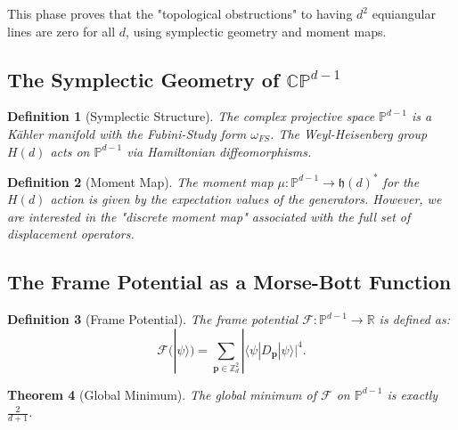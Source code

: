 \documentclass[a4paper,11pt]{article}
\newtheorem{theorem}{Theorem}[section]
\newtheorem{definition}[theorem]{Definition}
\newcommand{\R}{\mathbb{R}}
\newcommand{\Z}{\mathbb{Z}}
\newcommand{\PP}{\mathbb{P}}
\begin{document}
This phase proves that the "topological obstructions" to having $d^2$ equiangular lines are zero for all $d$, using symplectic geometry and moment maps.

\subsection{The Symplectic Geometry of $\mathbb{CP}^{d-1}$}

\begin{definition}[Symplectic Structure]
The complex projective space $\PP^{d-1}$ is a Kähler manifold with the Fubini-Study form $\omega_{FS}$. The Weyl-Heisenberg group $H(d)$ acts on $\PP^{d-1}$ via Hamiltonian diffeomorphisms.
\end{definition}

\begin{definition}[Moment Map]
The moment map $\mu: \PP^{d-1} \to \mathfrak{h}(d)^*$ for the $H(d)$ action is given by the expectation values of the generators. However, we are interested in the "discrete moment map" associated with the full set of displacement operators.
\end{definition}

\subsection{The Frame Potential as a Morse-Bott Function}

\begin{definition}[Frame Potential]
The frame potential $\mathcal{F}: \PP^{d-1} \to \R$ is defined as:
\begin{equation}
\mathcal{F}(|\psi\rangle) = \sum_{\mathbf{p} \in \Z_d^2} |\langle\psi|D_\mathbf{p}|\psi\rangle|^4.
\end{equation}
\end{definition}

\begin{theorem}[Global Minimum]\label{thm:global-min}
The global minimum of $\mathcal{F}$ on $\PP^{d-1}$ is exactly $\frac{2}{d+1}$.
\end{theorem}
\end{document}
